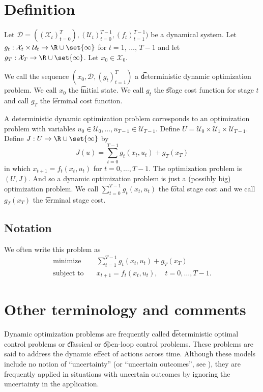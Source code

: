 
\section*{Definition}

Let $\mathcal{D}  = ((\mathcal{X} _t)_{t = 0}^{T}), (\mathcal{U} _t)_{t=0}^{T-1}, (f_t)_{t=1}^{T-1})$ be a dynamical system.
Let $g_t: \mathcal{X} _t \times  \mathcal{U} _t \to \R  \cup \set{\infty}$ for $t = 1$, $\dots $, $T-1$ and let $g_{T}: \mathcal{X} _T \to \R  \cup \set{\infty}$.
Let $x_0 \in \mathcal{X} _0$.

We call the sequence $(x_0, \mathcal{D} , (g_t)_{t = 1}^{T})$ a \t{deterministic dynamic optimization problem}.
We call $x_0$ the \t{initial state}.
We call $g_t$ the \t{stage cost function} for stage $t$ and call $g_T$ the \t{terminal cost function}.

A deterministic dynamic optimization problem corresponds to an optimization problem with variables $u_0 \in \mathcal{U} _0, \dots , u_{T-1} \in \mathcal{U} _{T-1}$.
Define $U = \mathcal{U} _0 \times  \mathcal{U} _1 \times \mathcal{U} _{T-1}$.
Define $J: U \to \R  \cup \set{\infty}$ by
\[
J(u) = \sum_{t = 0}^{T-1} g_t(x_t, u_t) + g_T(x_T)
\]
in which $x_{t+1} = f_t(x_t, u_t)$ for $t = 0, \dots , T-1$.
The optimization problem is $(U, J)$.
And so a dynamic optimization problem is just a (possibly big) optimization problem.
We call $\sum_{t = 0}^{T-1} g_t(x_t, u_t)$ the \t{total stage cost} and we call $g_T(x_T)$ the \t{terminal stage cost}.

\subsection*{Notation}

We often write this problem as
\[
\begin{aligned}
\text{minimize}\quad & \sum_{t = 1}^{T-1} g_t(x_t, u_t) + g_T(x_T) \\
\text{subject to}\quad & x_{t+1} = f_t(x_t, u_t), \quad t = 0, \dots , T-1.
\end{aligned}
\]

\section*{Other terminology and comments}

Dynamic optimization problems are frequently called \t{deterministic optimal control} problems or \t{classical} or \t{open-loop control} problems.
These problems are said to address the dynamic effect of actions across time.
Although these models include no notion of ``uncertainty'' (or ``uncertain outcomes'', see ), they are frequently applied in situations with uncertain outcomes by ignoring the uncertainty in the application.

